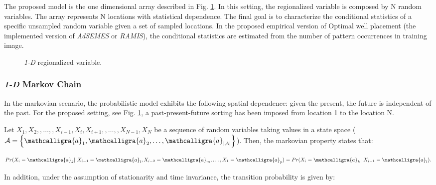 The proposed model is the one dimensional array described in Fig. \ref{fig:1DmodelArray}. In this setting, the regionalized variable is composed by N random variables. The array represents N locations with statistical dependence. The final goal is to characterize the conditional statistics of a specific unsampled random variable given a set of sampled locations. In the proposed empirical version of Optimal well placement (the implemented version of \emph{AdSEMES} or \emph{RAMIS}), the conditional statistics are estimated from the number of pattern occurrences in training image. 

\begin{figure}[H]
		\centering
{}
\caption{\emph{1-D} regionalized variable.}
\label{fig:1DmodelArray}
\end{figure} 


\subsubsection{\texorpdfstring{\emph{1-D}}{1D} Markov Chain}

In the markovian scenario, the probabilistic model exhibits the following spatial dependence: given the present, the future is independent of the past. For the proposed setting, see Fig. \ref{fig:1DmodelArray}, a past-present-future sorting has been imposed from location 1 to the location N.

Let $X_{1}, X_{2}, , \ldots ,  , X_{i-1} , X_{i} , X_{i+1} ,  , \ldots ,  , X_{N-1} , X_{N}$ be a sequence of random variables taking values in a state space ($\mathcal{A} = \left\{ \mathcalligra{a}_{1}, \mathcalligra{a}_{2}, \ldots , \mathcalligra{a}_{ \left| \mathcal{A} \right| } \right\} $). Then, the markovian property states that:


\begin{equation}
\label{eq:Markov_Property}
	 Pr( X_{i} = \mathcalligra{a}_{k} | \  X_{i-1} = \mathcalligra{a}_{l}, X_{i-2} = \mathcalligra{a}_{m}, \ldots , X_{1} = \mathcalligra{a}_{p})  = Pr(X_{i} = \mathcalligra{a}_{k} | \ X_{i-1} = \mathcalligra{a}_{l}) .
\end{equation}


In addition, under the assumption of stationarity and time invariance, the transition probability is given by:

